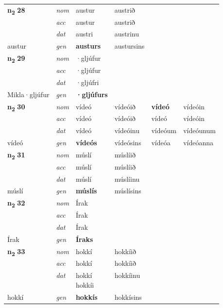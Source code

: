 \begin{longtable}[l]{X>{\footnotesize\itshape}XXXXX}
\multirow{3}{*}{{{\textbf{n{\textsubscript{2}}} \Large{\textbf{28}}}}} & nom & austur & austrið & \textbf{} &  \\*
 & acc & austur & austrið &  &  \\*
 & dat & austri & austrinu &  &  \\*
 {\footnotesize{austur}} & gen & \textbf{austurs} & austursins &  &  \\
\cmidrule{1-6}

\multirow{3}{*}{{{\textbf{n{\textsubscript{2}}} \Large{\textbf{29}}}}} & nom & ·gljúfur &  & \textbf{} &  \\*
 & acc & ·gljúfur &  &  &  \\*
 & dat & ·gljúfri &  &  &  \\*
 {\footnotesize{Mikla\allowbreak ·gljúfur}} & gen & \textbf{·gljúfurs} &  &  &  \\
\cmidrule{1-6}

\multirow{3}{*}{{{\textbf{n{\textsubscript{2}}} \Large{\textbf{30}}}}} & nom & vídeó & vídeóið & \textbf{vídeó} & vídeóin \\*
 & acc & vídeó & vídeóið & vídeó & vídeóin \\*
 & dat & vídeó & vídeóinu & vídeóum & vídeóunum \\*
 {\footnotesize{vídeó}} & gen & \textbf{vídeós} & vídeósins & vídeóa & vídeóanna \\
\cmidrule{1-6}

\multirow{3}{*}{{{\textbf{n{\textsubscript{2}}} \Large{\textbf{31}}}}} & nom & múslí & múslíið & \textbf{} &  \\*
 & acc & múslí & múslíið &  &  \\*
 & dat & múslí & múslíinu &  &  \\*
 {\footnotesize{múslí}} & gen & \textbf{múslís} & múslísins &  &  \\
\cmidrule{1-6}

\multirow{3}{*}{{{\textbf{n{\textsubscript{2}}} \Large{\textbf{32}}}}} & nom & Írak &  & \textbf{} &  \\*
 & acc & Írak &  &  &  \\*
 & dat & Írak &  &  &  \\*
 {\footnotesize{Írak}} & gen & \textbf{Íraks} &  &  &  \\
\cmidrule{1-6}

\multirow{3}{*}{{{\textbf{n{\textsubscript{2}}} \Large{\textbf{33}}}}} & nom & hokkí & hokkíið & \textbf{} &  \\*
 & acc & hokkí & hokkíið &  &  \\*
 & dat & \specialcell{hokkí\\ hokkíi} & hokkíinu &  &  \\*
 {\footnotesize{hokkí}} & gen & \textbf{hokkís} & hokkísins &  &  \\
\cmidrule{1-6}


\end{longtable}
